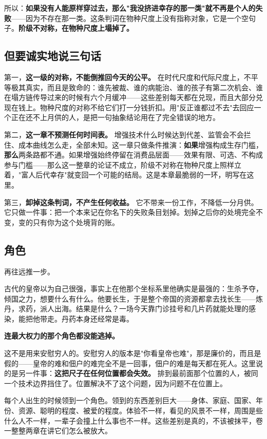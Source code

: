\documentclass[11pt,a4paper]{ctexart}
\begin{document}
所以：\textbf{如果没有人能原样穿过去，那么"我没挤进幸存的那一类"就不再是个人的失败}——因为不存在那一类。这条判词在物种尺度上没有指称对象，它是一个空句子。\textbf{阶级不对称，在物种尺度上塌掉了。}

\subsection{但要诚实地说三句话}

第一，\textbf{这一级的对称，不能倒推回今天的公平。} 在时代尺度和代际尺度上，不平等极其真实，而且是致命的：谁先被裁、谁的病能治、谁的孩子有第二次机会、谁在塌方链传导过来的时候有六个月缓冲——这些差别每天都在兑现，而且大部分兑现在钱上。物种尺度的对称不给它们打一分钱折扣。用"反正谁都过不去"去回应一个正在还不上月供的人，是把一句抽象结论用在了完全错误的地方。

第二，\textbf{这一章不预测任何时间表。} 增强技术什么时候达到代差、监管会不会拦住、成本曲线怎么走，全部未知。这一章只做条件推演：\textbf{如果}增强构成生存门槛，\textbf{那么}两条路都不通。如果增强始终停留在消费品层面——效果有限、可选、不构成参与门槛——那么这一整章的论证不成立，阶级不对称在物种尺度上照样立着，"富人后代幸存"就变回一个可能的结局。这是本章最脆弱的一环，明写在这里。

第三，\textbf{卸掉这条判词，不产生任何收益。} 它不带来一份工作，不降低一分月供。它只做一件事：把一个本来记在你名下的失败条目划掉。划掉之后你的处境完全不变，变的只有你为这个处境背的账。

\subsection{角色}

再往远推一步。

古代的皇帝以为自己很强，事实上在他那个坐标系里他确实是最强的：生杀予夺，倾国之力，想要什么有什么。他要长生，于是整个帝国的资源都拿去找长生——炼丹，求药，派人出海。结果是什么？一场今天靠门诊挂号和几片药就能处理的感染，能把他带走。丹药本身还经常是毒。

\textbf{连最大权力的那个角色都没能逃掉。}

这不是用来安慰穷人的。安慰穷人的版本是"你看皇帝也难"，那是廉价的，而且是假的——皇帝的难和佃户的难完全不是一回事，佃户的难是每天都在死人。这里说的是另一件事：\textbf{这把尺子在任何位置都会失效。} 排到最前面那个位置的人，被同一个技术边界挡住了。位置解决不了这个问题，因为问题不在位置上。

每个人出生的时候领到一个角色。领到的东西差别巨大——身体、家庭、国家、年份、资源、聪明的程度、被爱的程度。体验不一样，看见的风景不一样，周围是些什么人不一样，一辈子会撞上什么事也不一样。这些差别是真的，不该被抹平，卷一整整两章在讲它们怎么被放大。
\end{document}
